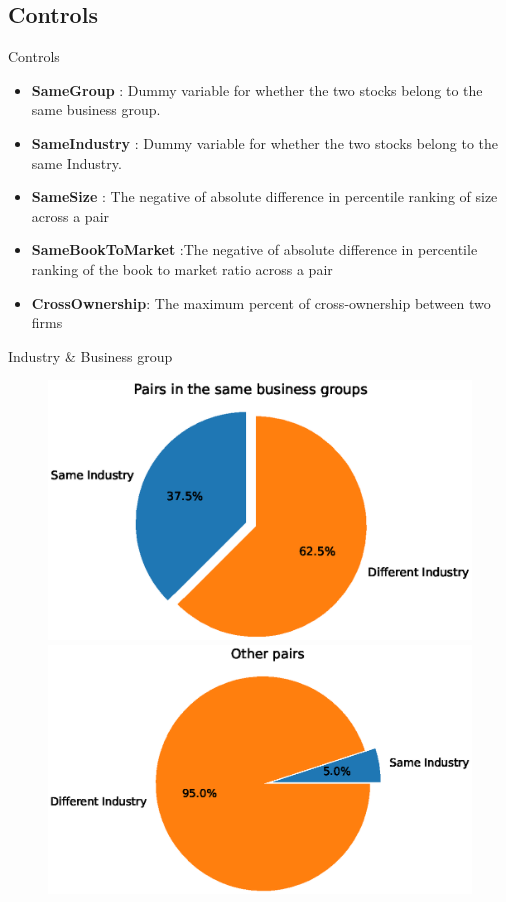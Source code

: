 \documentclass{beamer}
\begin{document}
	\subsection{Controls}
	\begin{frame}{Controls}
		\begin{itemize}
			
			\item \textbf{SameGroup} : Dummy variable for whether the two stocks belong to the same business group.
			
			
			\item \textbf{SameIndustry} : Dummy variable for whether the two stocks belong to the same Industry.
			
			\item \textbf{SameSize} : The negative of absolute difference in percentile ranking of size across a pair
			
			\item \textbf{SameBookToMarket} :The negative of absolute difference in percentile ranking of the book to market ratio across a pair
			
			\item \textbf{CrossOwnership}: The maximum percent of cross-ownership between two firms
		\end{itemize}
	\end{frame}
	
	
	
	\begin{frame}{Industry \& Business group}
				\begin{table}[htbp]
			\centering \scriptsize
			{
				
			}
		\end{table}
		\begin{figure}[htbp]
			\includegraphics[width=0.45\linewidth]{Output/sameIndustryinBG.eps}
			\includegraphics[width=0.45\linewidth]{Output/sameIndustryNoinBG.eps}
			
		\end{figure}
	\end{frame}
	
\end{document}
